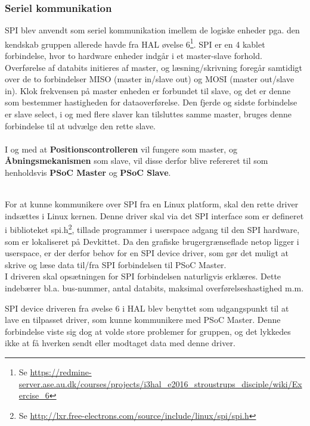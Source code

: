 \subsubsection{Seriel kommunikation}
\label{sub:SPI}
SPI blev anvendt som seriel kommunikation imellem de logiske enheder pga. den kendskab gruppen allerede havde fra HAL øvelse 6\footnote{Se \url{https://redmine-server.ase.au.dk/courses/projects/i3hal_e2016_stroustrups_disciple/wiki/Exercise_6}}. SPI er en 4 kablet
forbindelse, hvor to hardware enheder indgår i et master-slave forhold. Overførelse af databits initieres af master, og læsning/skrivning foregår samtidigt 
over de to forbindelser MISO (master in/slave out) og MOSI (master out/slave in). Klok frekvensen på master enheden er forbundet til slave, og det er denne 
som bestemmer hastigheden for dataoverførelse. Den fjerde og sidste forbindelse er slave select, i og med flere slaver kan tilsluttes samme master, bruges 
denne forbindelse til at udvælge den rette slave. \\
\\
I og med at \textbf{Positionscontrolleren} vil fungere som master, og \textbf{Åbningsmekanismen} som slave, vil disse derfor blive refereret til som henholdsvis \textbf{PSoC Master} og \textbf{PSoC Slave}.

\\ 
For at kunne kommunikere over SPI fra en Linux platform, skal den rette driver indsættes i Linux kernen. Denne driver skal via det SPI interface som
er defineret i biblioteket spi.h\footnote{Se \url{http://lxr.free-electrons.com/source/include/linux/spi/spi.h}}, tillade programmer i userspace adgang til den SPI hardware, som er lokaliseret på Devkittet. Da den grafiske brugergrænseflade
netop ligger i userspace, er der derfor behov for en SPI device driver, som gør det muligt at skrive og læse data til/fra SPI forbindelsen til PSoC Master.\\

I driveren skal opsætningen for SPI forbindelsen naturligvis erklæres. Dette indebærer bl.a. bus-nummer, antal databits, maksimal overførelseshastighed m.m.  
 
SPI device driveren fra øvelse 6 i HAL blev benyttet som udgangspunkt til at lave en tilpasset driver, som kunne kommunikere med PSoC Master. 
Denne forbindelse viste sig dog at volde store problemer for gruppen, og det lykkedes ikke at få hverken sendt eller modtaget data med denne driver.\\

